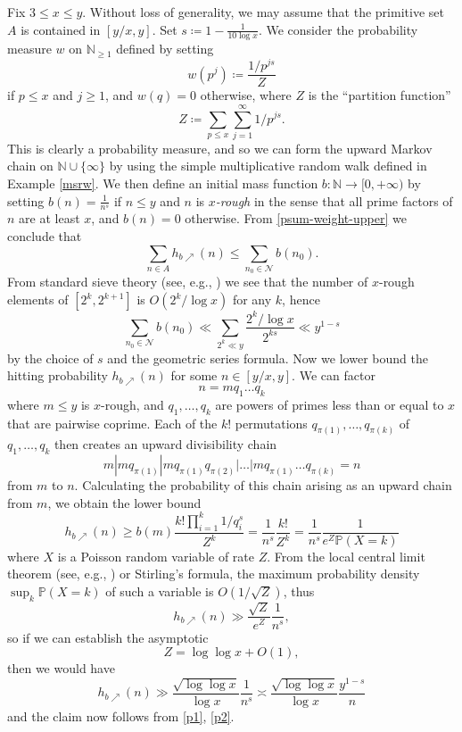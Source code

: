 \documentclass[12pt]{amsart}
\theoremstyle{definition}
\theoremstyle{remark}
\numberwithin{equation}{section}
\newcommand{\N}{{\mathbb N}}
\newcommand{\1}{{\mathbf 1}}
\begin{document}
Fix $3 \leq x \leq y$.  Without loss of generality, we may assume that the primitive set $A$ is contained in $[y/x,y]$.
Set $s \coloneq 1 - \frac{1}{10 \log x}$.  We consider the probability measure $w$ on $\N_{\geq 1}$ defined by setting
$$ w(p^j) \coloneq \frac{1/p^{js}}{Z}$$
if $p \leq x$ and $j \geq 1$, and $w(q)=0$ otherwise, where $Z$ is the ``partition function''
$$ Z \coloneq \sum_{p \leq x} \sum_{j=1}^\infty 1/p^{js}.$$
This is clearly a probability measure, and so we can form the upward Markov chain on $\N \cup \{\infty\}$ by using the simple multiplicative random walk defined in Example \ref{msrw}.  We then define an initial mass function $b \colon \N \to [0,+\infty)$ by setting $b(n) = \frac{1}{n^s}$ if $n \leq y$ and $n$ is \emph{$x$-rough} in the sense that all prime factors of $n$ are at least $x$, and $b(n)=0$ otherwise.  From \eqref{psum-weight-upper} we conclude that
\begin{equation}\label{p1}
 \sum_{n \in A} h_{b\nearrow}(n) \leq \sum_{n_0 \in {\mathcal N}} b(n_0).
 \end{equation}
From standard sieve theory (see, e.g., \cite[Chapter III.6, Theorem 3]{tenenbaum}) we see that the number of $x$-rough elements of $[2^k, 2^{k+1}]$ is $O(2^k / \log x)$ for any $k$, hence
\begin{equation}\label{p2}
\sum_{n_0 \in {\mathcal N}} b(n_0) \ll \sum_{2^k \ll y} \frac{2^k/\log x}{2^{ks}} \ll y^{1-s}
\end{equation}
by the choice of $s$ and the geometric series formula.  Now we lower bound the hitting probability $h_{b\nearrow}(n)$ for some $n \in [y/x,y]$.  We can factor
$$ n = m q_1 \dots q_k$$
where $m \leq y$ is $x$-rough, and $q_1,\dots,q_k$ are powers of primes less than or equal to $x$ that are pairwise coprime.  Each of the $k!$ permutations $q_{\pi(1)},\dots,q_{\pi(k)}$ of $q_1,\dots,q_k$ then creates an upward divisibility chain
$$ m | m q_{\pi(1)} | m q_{\pi(1)} q_{\pi(2)} | \dots | m q_{\pi(1)} \dots q_{\pi(k)} = n$$
from $m$ to $n$.  Calculating the probability of this chain arising as an upward chain from $m$, we obtain the lower bound
$$h_{b\nearrow}(n) \geq b(m) \frac{k! \prod_{i=1}^k 1/q_i^s}{Z^k} = \frac{1}{n^s} \frac{k!}{Z^k} = \frac{1}{n^s} \frac{1}{e^Z \mathbb{P}(X = k)}$$
where $X$ is a Poisson random variable of rate $Z$.  From the local central limit theorem (see, e.g., \cite[Chapter VII]{petrov}) or Stirling's formula, the maximum probability density $\sup_k \mathbb{P}(X=k)$ of such a variable is $O(1/\sqrt{Z})$, thus
$$h_{b\nearrow}(n) \gg \frac{\sqrt{Z}}{e^Z} \frac{1}{n^s},$$
so if we can establish the asymptotic
\begin{equation}\label{qasym}
 Z = \log\log x + O(1),
 \end{equation}
then we would have
$$h_{b\nearrow}(n) \gg \frac{\sqrt{\log\log x}}{\log x} \frac{1}{n^s} \asymp \frac{\sqrt{\log\log x}}{\log x} \frac{y^{1-s}}{n} $$
and the claim now follows from \eqref{p1}, \eqref{p2}.
\end{document}
